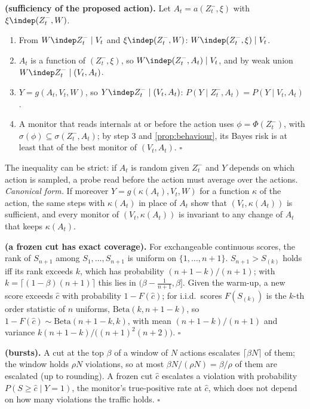 \textbf{ (sufficiency of the proposed action).} Let $A_t=a(Z^-_t,\xi)$ with $\xi\indep(Z^-_t,W)$.
\begin{enumerate}
\item From $W\indep Z^-_t\mid V_t$ and $\xi\indep(Z^-_t,W)$: $W\indep(Z^-_t,\xi)\mid V_t$.
\item $A_t$ is a function of $(Z^-_t,\xi)$, so $W\indep(Z^-_t,A_t)\mid V_t$, and by weak union $W\indep Z^-_t\mid(V_t,A_t)$.
\item $Y=g(A_t,V_t,W)$, so $Y\indep Z^-_t\mid(V_t,A_t)$: $P(Y\mid Z^-_t,A_t)=P(Y\mid V_t,A_t)$.
\item A monitor that reads internals at or before the action uses $\phi=\Phi(Z^-_t)$, with $\sigma(\phi)\subseteq\sigma(Z^-_t,A_t)$;
  by step 3 and \cref{prop:behaviour}, its Bayes risk is at least that of the best monitor of $(V_t,A_t)$. $\square$
\end{enumerate}
The inequality can be strict: if $A_t$ is random given $Z^-_t$ and $Y$ depends on which action is sampled, a probe read before
the action must average over the actions. \emph{Canonical form.} If moreover $Y=g(\kappa(A_t),V_t,W)$ for a function $\kappa$ of the
action, the same steps with $\kappa(A_t)$ in place of $A_t$ show that $(V_t,\kappa(A_t))$ is sufficient, and every monitor of
$(V_t,\kappa(A_t))$ is invariant to any change of $A_t$ that keeps $\kappa(A_t)$.

\textbf{ (a frozen cut has exact coverage).} For exchangeable continuous scores, the rank of $S_{n+1}$ among
$S_1,\dots,S_{n+1}$ is uniform on $\{1,\dots,n+1\}$. $S_{n+1}>S_{(k)}$ holds iff its rank exceeds $k$, which has probability
$(n+1-k)/(n+1)$; with $k=\lceil(1-\beta)(n+1)\rceil$ this lies in $(\beta-\frac{1}{n+1},\beta]$. Given the warm-up, a new score
exceeds $\hat c$ with probability $1-F(\hat c)$; for i.i.d.\ scores $F(S_{(k)})$ is the $k$-th order statistic of $n$ uniforms,
$\mathrm{Beta}(k,n+1-k)$, so $1-F(\hat c)\sim\mathrm{Beta}(n+1-k,k)$, with mean $(n+1-k)/(n+1)$ and variance
$k(n+1-k)/\big((n+1)^2(n+2)\big)$. $\square$

\textbf{ (bursts).} A cut at the top $\beta$ of a window of $N$ actions escalates $\lceil\beta N\rceil$ of them;
the window holds $\rho N$ violations, so at most $\beta N/(\rho N)=\beta/\rho$ of them are escalated (up to rounding). A frozen
cut $\hat c$ escalates a violation with probability $P(S\ge\hat c\mid Y{=}1)$, the monitor's true-positive rate at $\hat c$,
which does not depend on how many violations the traffic holds. $\square$
